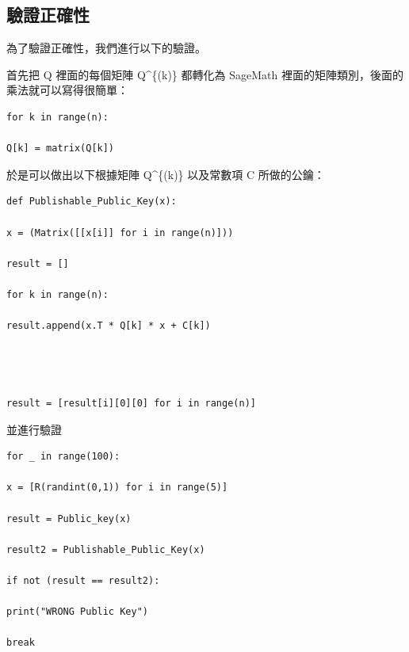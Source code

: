 \documentclass[
]{article}
\begin{document}
\hypertarget{ux9a57ux8b49ux6b63ux78baux6027}{%
\subsection{驗證正確性}\label{ux9a57ux8b49ux6b63ux78baux6027}}

為了驗證正確性，我們進行以下的驗證。

首先把 Q 裡面的每個矩陣 Q\^{}\{(k)\} 都轉化為 SageMath
裡面的矩陣類別，後面的乘法就可以寫得很簡單：

\begin{verbatim}
for k in range(n):

Q[k] = matrix(Q[k])
\end{verbatim}

於是可以做出以下根據矩陣 Q\^{}\{(k)\} 以及常數項 C 所做的公鑰：

\begin{verbatim}
def Publishable_Public_Key(x):

x = (Matrix([[x[i]] for i in range(n)]))

result = []

for k in range(n):

result.append(x.T * Q[k] * x + C[k])

  
  

result = [result[i][0][0] for i in range(n)]
\end{verbatim}

並進行驗證

\begin{verbatim}
for _ in range(100):

x = [R(randint(0,1)) for i in range(5)]

result = Public_key(x)

result2 = Publishable_Public_Key(x)

if not (result == result2):

print("WRONG Public Key")

break
\end{verbatim}
\end{document}
